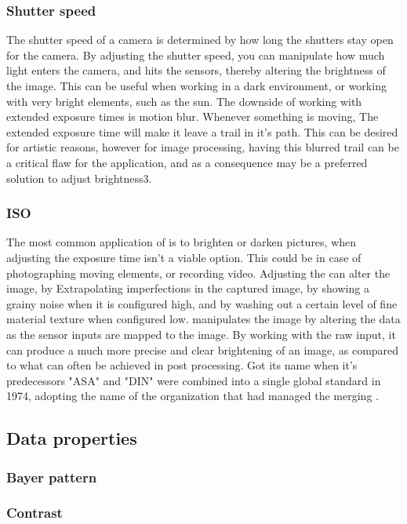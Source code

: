 \subsubsection{Shutter speed}
The shutter speed of a camera is determined by how long the shutters stay open for the camera. By adjusting the shutter speed, you can manipulate how much light enters the camera, and hits the sensors, thereby altering the brightness of the image. This can be useful when working in a dark environment, or working with very bright elements, such as the sun. The downside of working with extended exposure times is motion blur\citep{PLShutter}. Whenever something is moving, The extended exposure time will make it leave a trail in it's path. This can be desired for artistic reasons, however for image processing, having this blurred trail can be a critical flaw for the application, and as a consequence  may be a preferred solution to adjust brightness3\citep{AdobeShutter}.
\subsubsection{ISO}
The most common application of  is to brighten or darken pictures, when adjusting the exposure time isn't a viable option. This could be in case of photographing moving elements, or recording video. Adjusting the  can alter the image, by Extrapolating imperfections in the captured image, by showing a grainy noise when it is configured high, and by washing out a certain level of fine material texture when configured low\citep{NikonISO}.  manipulates the image by altering the data as the sensor inputs are mapped to the image. By working with the raw input, it can produce a much more precise and clear brightening of an image, as compared to what can often be achieved in post processing.  Got its name when it's predecessors "ASA" and "DIN" were combined into a single global standard in 1974, adopting the name of the organization that had managed the merging \citep{PLISO}.

\subsection{Data properties}
\subsubsection{Bayer pattern}
\subsubsection{Contrast}
